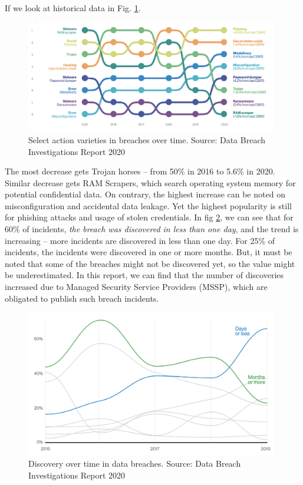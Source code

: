 \documentclass[nostrict]{szablonPG}
\begin{document}
If we look at historical data in Fig. \ref{fig:data-breach-historical}.
\begin{figure}[h!]
    \includegraphics[width=11cm]{img/data-breach-historical.png}
    \centering
    \caption{Select action varieties in breaches over time. Source: Data Breach Investigations Report 2020}
    \label{fig:data-breach-historical}
\end{figure} 
The most decrease gets Trojan horses -- from 50\% in 2016 to 5.6\% in 2020. Similar decrease gets RAM Scrapers, which search operating system memory for potential confidential data. 
On contrary, the highest increase can be noted on misconfiguration and accidental data leakage. Yet the highest popularity is still for phishing attacks and usage of stolen credentials. 
In fig \ref{fig:credentials-steal-discovery}, we can see that for 60\% of incidents, \textit{the breach was discovered in less than one day}, and the trend is increasing -- more incidents are discovered in less than one day. For 25\% of incidents, the incidents were discovered in one or more months. But, it must be noted that some of the breaches might not be discovered yet, so the value might be underestimated. In this report, we can find that the number of discoveries increased due to Managed Security Service Providers (MSSP), which are obligated to publish such breach incidents.

\begin{figure}[h!]
    \includegraphics[width=11cm]{img/credentials-steal-discovery.png}
    \centering
    \caption{Discovery over time in data breaches. Source: Data Breach Investigations Report 2020}
    \label{fig:credentials-steal-discovery}
\end{figure} 
\end{document}
